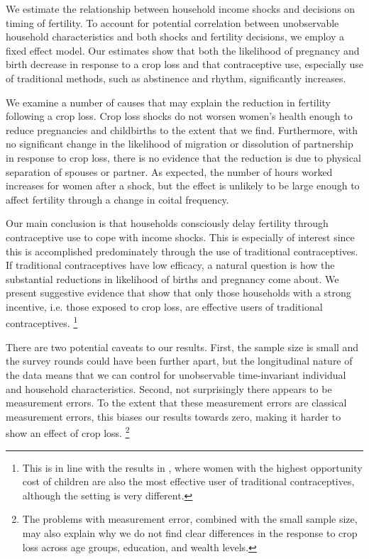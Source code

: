 \documentclass[letterpaper,12pt]{article}
\begin{document}
We estimate the relationship between household income shocks and decisions
on timing of fertility. 
To account for potential correlation between unobservable household
characteristics and both shocks and fertility decisions, we employ a fixed effect model.
Our estimates show that both the likelihood of pregnancy and birth decrease in
response to a crop loss and that contraceptive use, especially use of traditional 
methods, such as abstinence and rhythm, significantly increases. 

We examine a number of causes that may explain the reduction 
in fertility following a crop loss.
Crop loss shocks do not worsen women's health enough to 
reduce pregnancies and childbirths to the extent that we find.
Furthermore, with no significant change in the likelihood of migration or 
dissolution of partnership in response to crop loss, there is no evidence 
that the reduction is due to physical separation of spouses or partner.
As expected, the number of hours worked increases for women after a shock, 
but the effect is unlikely to be large enough to affect fertility 
through a change in coital frequency.

Our main conclusion is that households consciously delay 
fertility through contraceptive use to cope with income shocks. 
This is especially of interest since this is accomplished 
predominately through the use of traditional contraceptives.
If traditional contraceptives have low efficacy, a natural question is 
how the substantial reductions in likelihood of births and pregnancy 
come about.
We present suggestive evidence that show that only those households
with a strong incentive, i.e. those exposed to crop loss, are 
effective users of traditional contraceptives.%
\footnote{
This is in line with the results in \cite{Rosenzweig1989},
where women with the highest opportunity cost of children
are also the most effective user of traditional contraceptives,
although the setting is very different.
}


There are two potential caveats to our results.
First, the sample size is small and the survey rounds
could have been further apart, but the longitudinal nature
of the data means that we can control for unobservable 
time-invariant individual and household characteristics.
Second, not surprisingly there appears to be measurement 
errors.
To the extent that these measurement errors are classical 
measurement errors, this biases our results towards zero,
making it harder to show an effect of crop loss.%
\footnote{
The problems with measurement error, combined with the small
sample size, may also explain why we do not find clear
differences in the response to crop loss across age groups,
education, and wealth levels.
}
\end{document}
